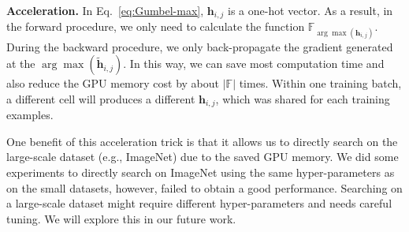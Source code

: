 \documentclass[10pt,twocolumn,letterpaper]{article}
\def\Eqref#1{Eq.~\eqref{#1}}
\def\vh{{\bm{h}}}
\def\sF{{\mathbb{F}}}
\begin{document}
{\bf Acceleration.}
In \Eqref{eq:Gumbel-max}, $\vh_{i,j}$ is a one-hot vector. As a result, in the forward procedure, we only need to calculate the function $\sF_{\arg\max(\vh_{i,j})}$.
During the backward procedure, we only back-propagate the gradient generated at the $\arg\max(\tilde{\vh}_{i,j})$.
In this way, we can save most computation time and also reduce the GPU memory cost by about $|\sF|$ times.
Within one training batch, a different cell will produces a different $\vh_{i,j}$, which was shared for each training examples.


One benefit of this acceleration trick is that it allows us to directly search on the large-scale dataset (e.g., ImageNet) due to the saved GPU memory. We did some experiments to directly search on ImageNet using the same hyper-parameters as on the small datasets, however, failed to obtain a good performance.
Searching on a large-scale dataset might require different hyper-parameters and needs careful tuning. We will explore this in our future work.
\end{document}
